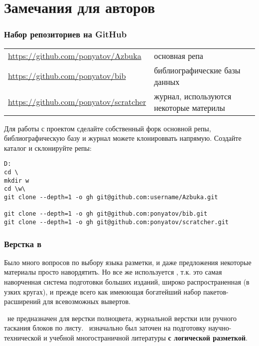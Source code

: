 \part{Замечания для авторов}

\section{Набор репозиториев на GitHub}

\begin{tabular}{l l}

\url{https://github.com/ponyatov/Azbuka}
& основная репа \\

\url{https://github.com/ponyatov/bib}
& библиографические базы данных \\

\url{https://github.com/ponyatov/scratcher}
& журнал, используются некоторые материлы \\

\end{tabular}
\bigskip

Для работы с проектом сделайте собственный форк основной репы,
библиографическую базу и журнал можете клонироввать напрямую.
Создайте каталог и склонируйте репы:

\begin{lstlisting}
D:
cd \
mkdir w
cd \w\
git clone --depth=1 -o gh git@github.com:username/Azbuka.git

git clone --depth=1 -o gh git@github.com:ponyatov/bib.git
git clone --depth=1 -o gh git@github.com:ponyatov/scratcher.git
\end{lstlisting}

\section{Верстка в \latex}

Было много вопросов по выбору языка разметки, и даже предложения некоторые
материалы просто навордятить. Но все же используется \latex, т.к. это самая
наворченная система подготовки больших изданий, широко распространенная (в
узких кругах), и прежде всего как имеюющая богатейший набор пакетов-расширений
для всевозможных вывертов.

\bigskip
\latex\ не предназначен для верстки полноцвета, журнальной верстки или
ручного таскания блоков по листу. \latex\ изначально был заточен на подготовку
научно-технической и учебной многостраничной литературы \textbf{с логической
разметкой}.

